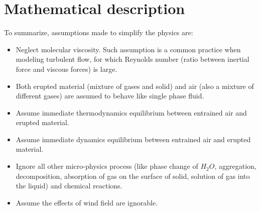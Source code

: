 \section{Mathematical description}\label{sec:chp2-Mathematical-Description}

To summarize, assumptions made to simplify the physics are:
\begin{itemize}
\item Neglect molecular viscosity. Such assumption is a common practice when modeling turbulent flow, for which Reynolds number (ratio between inertial force and viscous forces) is large.
\item Both erupted material (mixture of gases and solid) and air (also a mixture of different gases) are assumed to behave like single phase fluid.
\item Assume immediate thermodynamics equilibrium between entrained air and erupted material. 
\item Assume immediate dynamics equilibrium between entrained air and erupted material.
\item Ignore all other micro-physics process (like phase change of $H_2O$, aggregation, decomposition, absorption of gas on the surface of solid, solution of gas into the liquid) and chemical reactions.
\item Assume the effects of wind field are ignorable.
\end{itemize}

